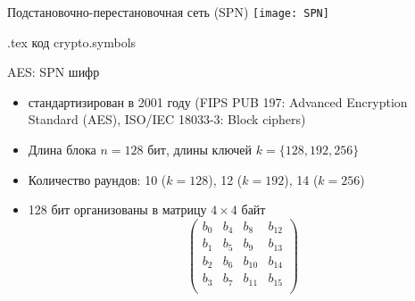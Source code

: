 \documentclass[usenames,dvipsnames,8pt,aspectratio=169]{beamer}
\begin{document}
\begin{frame}{Подстановочно-перестановочная сеть (SPN)}
\centering
{}
\texttt{[image: SPN]}

\vfill
\small
{\color{gray} {.tex код crypto.symbols}} 

\end{frame}

\begin{frame}{AES:  SPN шифр}
\Large 
\begin{itemize}
	\itemsep 10pt
	\item стандартизирован в 2001 году (FIPS PUB 197: Advanced Encryption Standard (AES), ISO/IEC 18033-3: Block ciphers)
	\item Длина блока $n = 128 $ бит, длины ключей $k = \{128, 192, 256 \}$
	\item Количество раундов: 10 ($k = 128$), 12 ($k=192$), 14 ($k=256$)
	\item 128 бит организованы в матрицу $4 \times 4$ байт
	\[
	\begin{pmatrix}
	b_0 & b_4 & b_8 & b_{12} \\
	b_1 & b_5 & b_9 & b_{13} \\
	b_2 & b_6 & b_{10} & b_{14} \\
	b_3 & b_7 & b_{11} & b_{15}  \\
	\end{pmatrix}
	\]
\end{itemize}
	
\end{frame}
\end{document}
